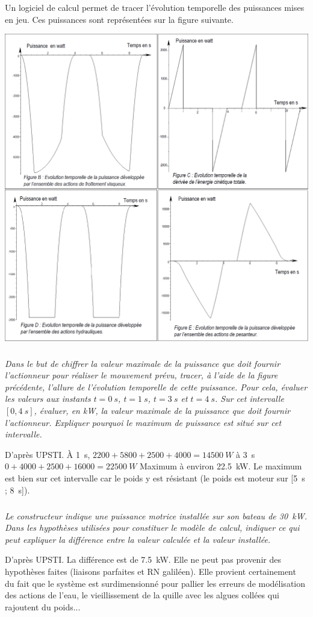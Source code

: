\documentclass[10pt,fleqn]{article} %
\begin{document}
\begin{multicols}{2}
Un logiciel de calcul permet de tracer l’évolution temporelle des puissances mises en jeu. Ces puissances sont
représentées sur la figure suivante. 

\begin{center}
\includegraphics[width=.8\linewidth]{images/fig_07}
\end{center}

\fi

\subparagraph{}\textit{Dans le but de chiffrer la valeur maximale de la puissance que doit fournir l’actionneur pour réaliser
le mouvement prévu, tracer, à l’aide de la figure précédente, l’allure de
l’évolution temporelle de cette puissance. Pour cela, évaluer les valeurs aux instants $t=\SI{0}{s}$, $t=\SI{1}{s}$,
$t=\SI{3}{s}$ et $t=\SI{4}{s}$.
Sur cet intervalle $[0,\SI{4}{s}]$, évaluer, en kW, la valeur maximale de la puissance que doit fournir
l’actionneur. Expliquer pourquoi le maximum de puissance est situé sur cet intervalle.}
\ifprof
\begin{corrige}
D'après UPSTI. À \SI{1}{s}, $2200+5800+2500+4000=\SI{14500}{W}$ à \SI{3}{s}
$0+4000+2500+16000=\SI{22500}{W}$
Maximum à environ \SI{22,5}{kW}.
Le maximum est bien sur cet intervalle car le poids y est résistant (le poids est moteur sur
[\SI{5}{s} ; \SI{8}{s}]).

\end{corrige}
\else
\fi
\subparagraph{}\textit{
Le constructeur indique une puissance motrice installée sur son bateau de \SI{30}{kW}.
Dans les hypothèses utilisées pour constituer le modèle de calcul, indiquer ce qui peut expliquer la
différence entre la valeur calculée et la valeur installée.}
\ifprof
\begin{corrige}
D'après UPSTI. La différence est de \SI{7,5}{kW}.
Elle ne peut pas provenir des hypothèses faites (liaisons parfaites et RN galiléen).
Elle provient certainement du fait que le système est surdimensionné
pour pallier les erreurs de modélisation des actions de l'eau, le vieillissement de la quille avec
les algues collées qui rajoutent du poids...
\end{corrige}
\else
\fi


\ifprof
\else
\end{multicols}
\fi
\end{document}
